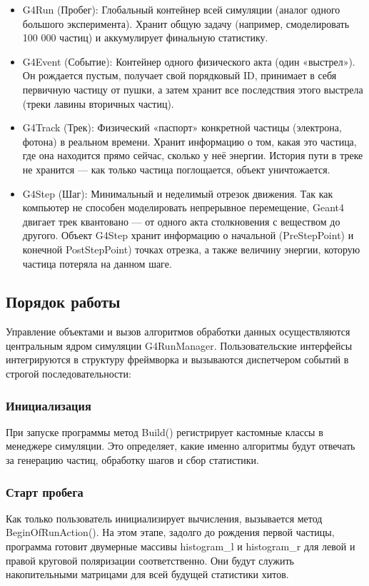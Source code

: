 \documentclass[14pt, a4paper]{extreport}
\begin{document}
\begin{itemize}
    \item G4Run (Пробег): Глобальный контейнер всей симуляции (аналог одного большого эксперимента). Хранит общую задачу (например, смоделировать 100 000 частиц) и аккумулирует финальную статистику.
    \item G4Event (Событие): Контейнер одного физического акта (один «выстрел»). Он рождается пустым, получает свой порядковый ID, принимает в себя первичную частицу от пушки, а затем хранит все последствия этого выстрела (треки лавины вторичных частиц).
    \item G4Track (Трек): Физический «паспорт» конкретной частицы (электрона, фотона) в реальном времени. Хранит информацию о том, какая это частица, где она находится прямо сейчас, сколько у неё энергии. История пути в треке не хранится — как только частица поглощается, объект уничтожается.
    \item G4Step (Шаг): Минимальный и неделимый отрезок движения. Так как компьютер не способен моделировать непрерывное перемещение, Geant4 двигает трек квантовано — от одного акта столкновения с веществом до другого. Объект G4Step хранит информацию о начальной (PreStepPoint) и конечной PostStepPoint) точках отрезка, а также величину энергии, которую частица потеряла на данном шаге.
\end{itemize}

\subsection{Порядок работы}
Управление объектами и вызов алгоритмов обработки данных осуществляются центральным ядром симуляции G4RunManager. Пользовательские интерфейсы интегрируются в структуру фреймворка и вызываются диспетчером событий в строгой последовательности:


\subsubsection{Инициализация}
При запуске программы метод Build() регистрирует кастомные классы в менеджере симуляции. Это определяет, какие именно алгоритмы будут отвечать за генерацию частиц, обработку шагов и сбор статистики.

\subsubsection{Старт пробега}
Как только пользователь инициализирует вычисления, вызывается метод BeginOfRunAction(). На этом этапе, задолго до рождения первой частицы, программа готовит двумерные массивы histogram\_l и histogram\_r для левой и правой круговой поляризации соответственно. Они будут служить накопительными матрицами для всей будущей статистики хитов.
\end{document}
